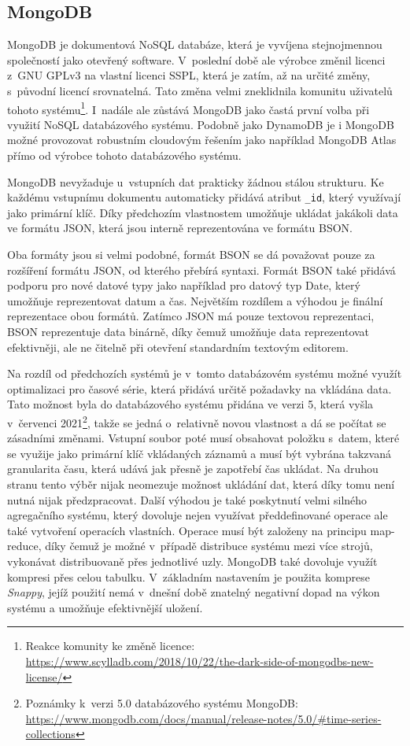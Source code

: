 \subsection{MongoDB}
MongoDB je dokumentová NoSQL databáze, která je vyvíjena stejnojmennou společností jako otevřený software. V~poslední době ale výrobce změnil licenci z~GNU GPLv3 na vlastní licenci SSPL, která je zatím, až na určité změny, s~původní licencí srovnatelná. Tato změna velmi zneklidnila komunitu uživatelů tohoto systému\footnote{Reakce komunity ke změně licence:  \url{https://www.scylladb.com/2018/10/22/the-dark-side-of-mongodbs-new-license/}}. I~nadále ale zůstává MongoDB jako častá první volba při využití NoSQL databázového systému. Podobně jako DynamoDB je i MongoDB možné provozovat robustním cloudovým řešením jako například MongoDB Atlas přímo od výrobce tohoto databázového systému.

MongoDB nevyžaduje u~vstupních dat prakticky žádnou stálou strukturu. Ke každému vstupnímu dokumentu automaticky přidává atribut \texttt{\_id}, který využívají jako primární klíč. Díky předchozím vlastnostem umožňuje ukládat jakákoli data ve formátu JSON, která jsou interně reprezentována ve formátu BSON.

Oba formáty jsou si velmi podobné, formát BSON se dá považovat pouze za rozšíření formátu JSON, od kterého přebírá syntaxi. Formát BSON také přidává podporu pro nové datové typy jako například pro datový typ Date, který umožňuje reprezentovat datum a čas. Největším rozdílem a výhodou je finální reprezentace obou formátů. Zatímco JSON má pouze textovou reprezentaci, BSON reprezentuje data binárně, díky čemuž umožňuje data reprezentovat efektivněji, ale ne čitelně při otevření standardním textovým editorem.

Na rozdíl od předchozích systémů je v~tomto databázovém systému možné využít optimalizaci pro časové série, která přidává určitě požadavky na vkládána data. Tato možnost byla do databázového systému přidána ve verzi 5, která vyšla v~červenci 2021\footnote{Poznámky k~verzi 5.0 databázového systému MongoDB: \url{https://www.mongodb.com/docs/manual/release-notes/5.0/\#time-series-collections}}, takže se jedná o~relativně novou vlastnost a dá se počítat se zásadními změnami. Vstupní soubor poté musí obsahovat položku s~datem, které se využije jako primární klíč vkládaných záznamů a musí být vybrána takzvaná granularita času, která udává jak přesně je zapotřebí čas ukládat. Na druhou stranu tento výběr nijak neomezuje možnost ukládání dat, která díky tomu není nutná nijak předzpracovat. Další výhodou je také poskytnutí velmi silného agregačního systému, který dovoluje nejen využívat předdefinované operace ale také vytvoření operacích vlastních. Operace musí být založeny na principu map-reduce, díky čemuž je možné v~případě distribuce systému mezi více strojů, vykonávat distribuovaně přes jednotlivé uzly. MongoDB také dovoluje využít kompresi přes celou tabulku. V~základním nastavením je použita komprese \textit{Snappy}, jejíž použití nemá v~dnešní době znatelný negativní dopad na výkon systému a umožňuje efektivnější uložení.

